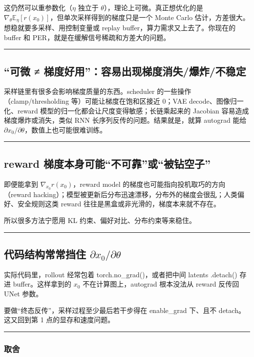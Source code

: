 这仍然可以重参数化（\(\eta\) 独立于 \(\theta\)），理论上可微。真正想优化的是 \(\nabla_\theta \mathbb{E}_\eta[r(x_0)]\)，但单次采样得到的梯度只是一个 Monte Carlo 估计，方差很大。想稳就要多采样、用控制变量或 replay buffer，算力需求又上去了。你现在的 buffer 和 PER，就是在缓解信号稀疏和方差大的问题。

\hrule

\subsection{“可微 ≠ 梯度好用”：容易出现梯度消失/爆炸/不稳定}

采样链里有很多会影响梯度质量的东西。scheduler 的一些操作（clamp/thresholding 等）可能让梯度在饱和区接近 0；VAE decode、图像归一化、reward 模型的归一化都会让尺度变得敏感；长链乘起来的 Jacobian 容易造成梯度爆炸或消失，类似 RNN 长序列反传的问题。结果就是，就算 autograd 能给 \(\partial x_0/\partial\theta\)，数值上也可能很难训练。

\hrule

\subsection{reward 梯度本身可能“不可靠”或“被钻空子”}

即便能拿到 \(\nabla_{x_0} r(x_0)\)，reward model 的梯度也可能指向投机取巧的方向（reward hacking）；模型被更新后分布迅速漂移，分布外的梯度会很乱；人类偏好、安全规则这类 reward 往往是黑盒或非光滑的，梯度本来就不存在。

所以很多方法宁愿用 KL 约束、偏好对比、分布约束等来稳住。

\hrule

\subsection{代码结构常常挡住 \(\partial x_0/\partial \theta\)}

实际代码里，rollout 经常包着 torch.no\_grad()，或者把中间 latents .detach() 存进 buffer。这样拿到的 \(x_0\) 不在计算图上，autograd 根本没法从 reward 反传回 UNet 参数。

要做“终态反传”，采样过程至少最后若干步得在 enable\_grad 下、且不 detach。这又回到第 1 点的显存和速度问题。

\hrule

\subsubsection{取舍}

